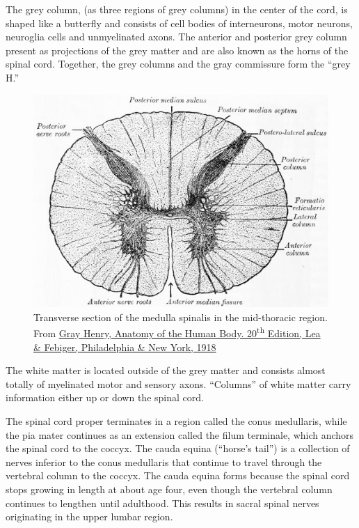 The grey column, (as three regions of grey columns) in the center of the cord, is shaped like a butterfly and consists of cell bodies of interneurons, motor neurons, neuroglia cells and unmyelinated axons. The anterior and posterior grey column present as projections of the grey matter and are also known as the horns of the spinal cord. Together, the grey columns and the gray commissure form the ``grey H.''



\begin{figure}

{\centering \includegraphics[width=0.7\linewidth]{./figures/cns/GrayAnat1918p752} 

}

\caption{Transverse section of the medulla spinalis in the mid-thoracic region. From \href{https://archive.org/details/anatomyofhumanbo1918gray/page/n6/mode/2up}{Gray Henry, Anatomy of the Human Body. 20\textsuperscript{th} Edition, Lea \& Febiger, Philadelphia \& New York, 1918}}\label{fig:transversecord}
\end{figure}

The white matter is located outside of the grey matter and consists almost totally of myelinated motor and sensory axons. ``Columns'' of white matter carry information either up or down the spinal cord.

The spinal cord proper terminates in a region called the conus medullaris, while the pia mater continues as an extension called the filum terminale, which anchors the spinal cord to the coccyx. The cauda equina (``horse's tail'') is a collection of nerves inferior to the conus medullaris that continue to travel through the vertebral column to the coccyx. The cauda equina forms because the spinal cord stops growing in length at about age four, even though the vertebral column continues to lengthen until adulthood. This results in sacral spinal nerves originating in the upper lumbar region.



